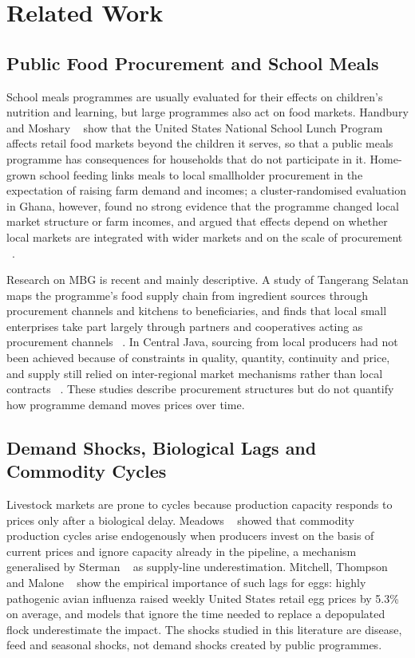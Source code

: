 \documentclass[10pt,twocolumn,a4paper]{article}
\begin{document}
\section{Related Work}\label{sec:related}

\subsection{Public Food Procurement and School Meals}

School meals programmes are usually evaluated for their effects on children's nutrition and learning, but large programmes also act on food markets. Handbury and Moshary ~\cite{handbury2021} show that the United States National School Lunch Program affects retail food markets beyond the children it serves, so that a public meals programme has consequences for households that do not participate in it. Home-grown school feeding links meals to local smallholder procurement in the expectation of raising farm demand and incomes; a cluster-randomised evaluation in Ghana, however, found no strong evidence that the programme changed local market structure or farm incomes, and argued that effects depend on whether local markets are integrated with wider markets and on the scale of procurement ~\cite{gelli2021}.


Research on MBG is recent and mainly descriptive. A study of Tangerang Selatan maps the programme's food supply chain from ingredient sources through procurement channels and kitchens to beneficiaries, and finds that local small enterprises take part largely through partners and cooperatives acting as procurement channels ~\cite{ipb2026}. In Central Java, sourcing from local producers had not been achieved because of constraints in quality, quantity, continuity and price, and supply still relied on inter-regional market mechanisms rather than local contracts ~\cite{ambarwati2025}. These studies describe procurement structures but do not quantify how programme demand moves prices over time.


\subsection{Demand Shocks, Biological Lags and Commodity Cycles}

Livestock markets are prone to cycles because production capacity responds to prices only after a biological delay. Meadows ~\cite{meadows1970} showed that commodity production cycles arise endogenously when producers invest on the basis of current prices and ignore capacity already in the pipeline, a mechanism generalised by Sterman ~\cite{sterman2000} as supply-line underestimation. Mitchell, Thompson and Malone ~\cite{mitchell2024} show the empirical importance of such lags for eggs: highly pathogenic avian influenza raised weekly United States retail egg prices by 5.3\% on average, and models that ignore the time needed to replace a depopulated flock underestimate the impact. The shocks studied in this literature are disease, feed and seasonal shocks, not demand shocks created by public programmes.
\end{document}
